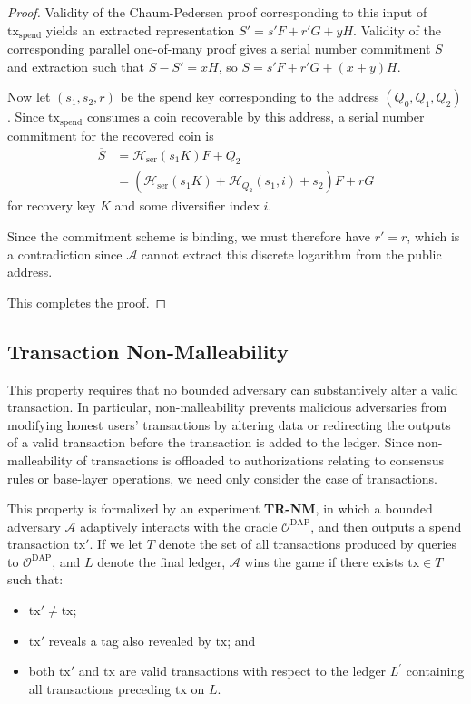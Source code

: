 \documentclass{llncs}
\newcommand{\hash}{\mathcal{H}}
\begin{document}
\begin{proof}
Validity of the Chaum-Pedersen proof corresponding to this input of $\text{tx}_{\text{spend}}$ yields an extracted representation $S' = s'F + r'G + yH$.
Validity of the corresponding parallel one-of-many proof gives a serial number commitment $S$ and extraction such that $S - S' = xH$, so $S = s'F + r'G + (x + y)H$.

Now let $(s_1,s_2,r)$ be the spend key corresponding to the address $(Q_0,Q_1,Q_2)$.
Since $\text{tx}_{\text{spend}}$ consumes a coin recoverable by this address, a serial number commitment for the recovered coin is
\begin{align*}
\overline{S} &= \hash_{\text{ser}}(s_1 K)F + Q_2 \\
&= (\hash_{\text{ser}}(s_1 K) + \hash_{Q_2}(s_1,i) + s_2)F + rG
\end{align*}
for recovery key $K$ and some diversifier index $i$.

Since the commitment scheme is binding, we must therefore have $r' = r$, which is a contradiction since $\mathcal{A}$ cannot extract this discrete logarithm from the public address.

This completes the proof.
\end{proof}


\subsection{Transaction Non-Malleability}

This property requires that no bounded adversary can substantively alter a valid transaction. 
In particular, non-malleability prevents malicious adversaries from modifying honest users' transactions by altering data or redirecting the outputs of a valid transaction before the transaction is added to the ledger.
Since non-malleability of  transactions is offloaded to authorizations relating to consensus rules or base-layer operations, we need only consider the case of  transactions.

This property is formalized by an experiment \textbf{TR-NM}, in which a bounded adversary $\mathcal{A}$ adaptively interacts with the oracle $\mathcal{O}^{\text{DAP}}$, and then outputs a spend transaction $\text{tx}'$.
If we let $T$ denote the set of all transactions produced by  queries to $\mathcal{O}^{\text{DAP}}$, and $L$ denote the final ledger, $\mathcal{A}$ wins the game if there exists $\text{tx} \in T$ such that:
\begin{itemize}
    \item $\text{tx}' \neq \text{tx}$; 
    \item $\text{tx}'$ reveals a tag also revealed by $\text{tx}$; and
    \item both $\text{tx}'$ and $\text{tx}$ are valid transactions with respect to the ledger $L^{\prime}$ containing all transactions preceding $\text{tx}$ on $L$.
\end{itemize}
\end{document}
